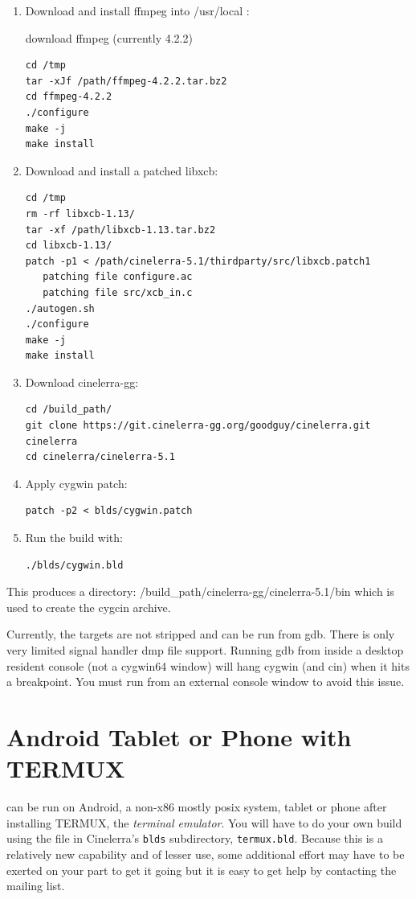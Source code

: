 \begin{enumerate}
\item Download and install ffmpeg into /usr/local :

  download ffmpeg (currently 4.2.2)
\begin{lstlisting}[style=sh]
cd /tmp
tar -xJf /path/ffmpeg-4.2.2.tar.bz2
cd ffmpeg-4.2.2
./configure
make -j
make install
\end{lstlisting}

\item Download and install a patched libxcb:
\begin{lstlisting}[style=sh]
cd /tmp
rm -rf libxcb-1.13/
tar -xf /path/libxcb-1.13.tar.bz2
cd libxcb-1.13/
patch -p1 < /path/cinelerra-5.1/thirdparty/src/libxcb.patch1
   patching file configure.ac
   patching file src/xcb_in.c
./autogen.sh
./configure
make -j
make install
\end{lstlisting}
\item Download cinelerra-gg:
\begin{lstlisting}[style=sh]
cd /build_path/
git clone https://git.cinelerra-gg.org/goodguy/cinelerra.git cinelerra
cd cinelerra/cinelerra-5.1
\end{lstlisting}
\item Apply cygwin patch:
\begin{lstlisting}[style=sh]
patch -p2 < blds/cygwin.patch
\end{lstlisting}
\item Run the build with:
\begin{lstlisting}[style=sh]
./blds/cygwin.bld
\end{lstlisting}
\end{enumerate}

This produces a directory: /build\_path/cinelerra-gg/cinelerra-5.1/bin
which is used to create the cygcin archive.

Currently, the targets are not stripped and can be run from gdb.
There is only very limited signal handler dmp file support.
Running gdb from inside a desktop resident console (not a cygwin64
window) will hang cygwin (and cin) when it hits a breakpoint.  You
must run from an external console window to avoid this issue.

\section{Android Tablet or Phone with TERMUX}%
\label{sec:android_termux}

\CGG{} can be run on Android, a non-x86 mostly posix system,
tablet or phone after installing TERMUX, the \textit{terminal emulator}.
You will have to do your own build using the file in Cinelerra's
\texttt{blds} subdirectory, \texttt{termux.bld}.
Because this is a relatively new capability and of lesser use, some
additional effort may have to be exerted on your part to get it going
but it is easy to get help by contacting the mailing list.

